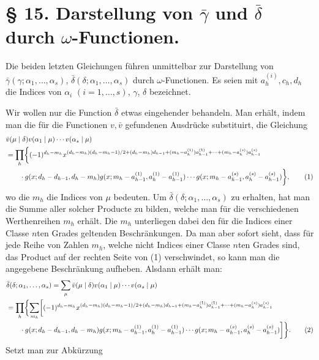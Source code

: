 \documentclass[11pt,a4paper]{article}
\begin{document}
\section*{§ 15. Darstellung von $\bar\gamma$ und $\bar\delta$ durch $\omega$-Functionen.}

Die beiden letzten Gleichungen führen unmittelbar zur Darstellung von $\bar\gamma(\gamma;\alpha_1,
\ldots,\alpha_s)$, $\bar\delta(\delta;\alpha_1,
\ldots,\alpha_s)$ durch $\omega$-Functionen. Es seien mit $a_h^{(i)},c_h,d_h$ die Indices von $\alpha_i$ $(i=1,\ldots,s)$, $\gamma$, $\delta$ bezeichnet.

Wir wollen nur die Function $\bar\delta$ etwas eingehender behandeln. Man erhält, indem man die für die Functionen $v,\bar v$ gefundenen Ausdrücke substituirt, die Gleichung
\begin{align}
&\bar v(\mu\mid\delta)v(\alpha_1\mid\mu)\cdots v(\alpha_s\mid\mu)\notag\\
&=\prod_h\biggl\{(-1)^{d_h-m_h}
 x^{(d_h-m_h)(d_h-m_h-1)/2+(d_h-m_h)d_{h-1}+(m_h-a_h^{(1)})a_{h-1}^{(1)}+\cdots+(m_h-a_h^{(s)})a_{h-1}^{(s)}}
\notag\\
&\qquad\cdot g(x;d_h-d_{h-1},d_h-m_h)g(x;m_h-a_{h-1}^{(1)},a_h^{(1)}-a_{h-1}^{(1)})
\cdots g(x;m_h-a_{h-1}^{(s)},a_h^{(s)}-a_{h-1}^{(s)})\biggr\},
\tag{1}
\end{align}
wo die $m_h$ die Indices von $\mu$ bedeuten. Um $\bar\delta(\delta;\alpha_1,
\ldots,\alpha_s)$ zu erhalten, hat man die Summe aller solcher Producte zu bilden, welche man für die verschiedenen Werthenreihen $m_h$ erhält. Die $m_h$ unterliegen dabei den für die Indices einer Classe $n$ten Grades geltenden Beschränkungen. Da man aber sofort sieht, dass für jede Reihe von Zahlen $m_h$, welche nicht Indices einer Classe $n$ten Grades sind, das Product auf der rechten Seite von (1) verschwindet, so kann man die angegebene Beschränkung aufheben. Alsdann erhält man:
\begin{align}
&\bar\delta(\delta;\alpha_1,\ldots,\alpha_s)
 =\sum_\mu \bar v(\mu\mid\delta)v(\alpha_1\mid\mu)\cdots v(\alpha_s\mid\mu)\notag\\
&=\prod_h\biggl\{\sum_{m_h}\biggl[(-1)^{d_h-m_h}
 x^{(d_h-m_h)(d_h-m_h-1)/2+(d_h-m_h)d_{h-1}+(m_h-a_h^{(1)})a_{h-1}^{(1)}+\cdots+(m_h-a_h^{(s)})a_{h-1}^{(s)}}\notag\\
&\qquad\cdot g(x;d_h-d_{h-1},d_h-m_h)g(x;m_h-a_{h-1}^{(1)},a_h^{(1)}-a_{h-1}^{(1)})\cdots g(x;m_h-a_{h-1}^{(s)},a_h^{(s)}-a_{h-1}^{(s)})\biggr]\biggr\}.
\tag{2}
\end{align}
Setzt man zur Abkürzung
\end{document}
